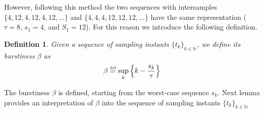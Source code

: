 \documentclass[12pt,draftcls,onecolumn]{IEEEtran} %
\newtheorem{lemma}{Lemma}
\newtheorem{definition}[theorem]{Definition}
\newcommand{\equals}{\stackrel{\mbox{\tiny{\rm def}}}{=}}
\newcommand{\NN}{\mathbb{N}}
\begin{document}
However, following this method the two sequences with intersamples \\
$\{4,12,4,12,4,12,\ldots\}$ and $\{4,4,4,12,12,12,\ldots\}$ have the
same representation ($\tau=8$, $s_1=4$, and $S_1=12$).  For this
reason we introduce the following definition.
\begin{definition}
  Given a sequence of sampling instants $\{t_k\}_{k\in\NN}$, we
  define its \emph{burstiness} $\beta$ as
  \begin{equation}
    \label{eq:I:defB}
    \beta\equals\sup_k\left\{k-\frac{s_k}{\tau}\right\}
  \end{equation}
\end{definition}

  


The burstiness $\beta$ is defined, starting from the worst-case
sequence $s_k$. Next lemma provides an interpretation of $\beta$ into
the sequence of sampling instants $\{t_k\}_{k\in\NN}$
\end{document}
